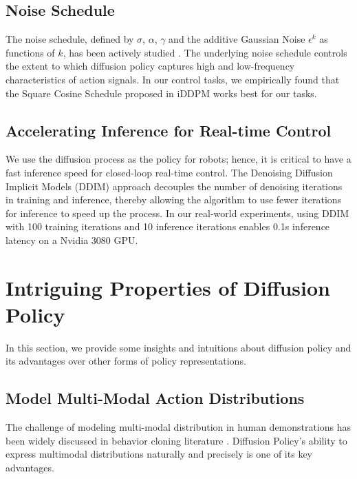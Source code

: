 \subsection{Noise Schedule}
\label{sec:method-noise-schedule}
The noise schedule, defined by $\sigma$, $\alpha$, $\gamma$ and the additive Gaussian Noise $\epsilon^k$ as functions of $k$, has been actively studied \cite{ho2020denoising, nichol2021improved}.  The underlying noise schedule controls the extent to which diffusion policy captures high and low-frequency characteristics of action signals. In our control tasks, we empirically found that the Square Cosine Schedule proposed in iDDPM \cite{nichol2021improved} works best for our tasks. 

\subsection{Accelerating Inference for Real-time Control}
We use the diffusion process as the policy for robots; hence, it is critical to have a fast inference speed for closed-loop real-time control. The Denoising Diffusion Implicit Models (DDIM) approach \cite{song2021ddim}  decouples the number of denoising iterations in training and inference, thereby allowing the algorithm to use fewer iterations for inference to speed up the process. In our real-world experiments, using DDIM with 100 training iterations and 10 inference iterations enables 0.1s inference latency on a Nvidia 3080 GPU.

\section{Intriguing Properties of Diffusion Policy}
In this section, we provide some insights and intuitions about diffusion policy and its advantages over other forms of policy representations. 



\subsection{Model Multi-Modal Action Distributions}
\label{sec:multimodal}
The challenge of modeling multi-modal distribution in human demonstrations has been widely discussed in behavior cloning literature \cite{ibc,bet,robomimic}. Diffusion Policy's ability to express multimodal distributions naturally and precisely is one of its key advantages. 


